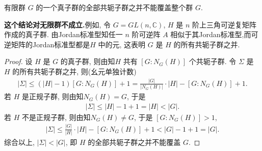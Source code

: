 \documentclass[../../main.tex]{subfiles}%
\begin{document}
\begin{proposition}\label{proposition:有限群的真子群的共轭子群之并不能覆盖整个群}
有限群 $G$ 的一个真子群的全部共轭子群之并不能覆盖整个群 $G$.
\end{proposition}
\begin{remark}
\textbf{这个结论对无限群不成立.}例如, 令 $G = GL(n,\mathbb{C})$, $H$ 是 $n$ 阶上三角可逆复矩阵作成的真子群. 由Jordan标准型知任一 $n$ 阶可逆阵 $A$ 相似于其Jordan标准型,而可逆矩阵的Jordan标准型都是$H$ 中的元, 这表明 $G$ 是 $H$ 的所有共轭子群之并.
\end{remark}
\begin{proof}

设 $H$ 是 $G$ 的真子群, 则由知$H$ 共有 $[G:N_G(H)]$ 个共轭子群. 令 $\Sigma$ 是 $H$ 的所有共轭子群之并, 则(幺元单独计数)
\begin{align*}
|\Sigma| \leqslant (|H| - 1)[G:N_G(H)] + 1 = \frac{|G|}{|N_G(H)|} \cdot |H| - [G:N_G(H)] + 1.
\end{align*}
若 $H$ 是正规子群, 则由知$N_G(H) = G$, 于是
\begin{align*}
|\Sigma| \leqslant |H| - 1 + 1 = |H| < |G|.
\end{align*}
若 $H$ 不是正规子群, 则由知$N_G(H) \neq G$, 于是 $[G:N_G(H)] > 1$,
\begin{align*}
|\Sigma| \leqslant \frac{|G|}{|H|} \cdot |H| - [G:N_G(H)] + 1 < |G| - 1 + 1 = |G|.
\end{align*}
综合以上, $|\Sigma| < |G|$, 即 $H$ 的全部共轭子群之并不能覆盖 $G$.

\end{proof}
\end{document}
